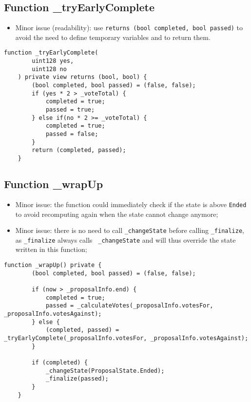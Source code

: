 \subsection{Function \_{}tryEarlyComplete}

\begin{itemize}
\item Minor issue (readability): use {\tt returns (bool completed,
  bool passed)} to avoid the need to define temporary variables and to
  return them.
\end{itemize}

\begin{lstlisting}[firstnumber=130]
    function _tryEarlyComplete(
        uint128 yes,
        uint128 no
    ) private view returns (bool, bool) {
        (bool completed, bool passed) = (false, false);
        if (yes * 2 > _voteTotal) {
            completed = true;
            passed = true;
        } else if(no * 2 >= _voteTotal) {
            completed = true;
            passed = false;
        }
        return (completed, passed);
    }
\end{lstlisting}

\subsection{Function \_{}wrapUp}

\begin{itemize}
\item Minor issue: the function could immediately check if the state
  is above {\tt Ended} to avoid recomputing again when the state
  cannot change anymore;
\item Minor issue: there is no need to call {\tt \_changeState} before
  calling {\tt \_finalize}, as {\tt \_finalize} always calls {\tt
    \_changeState} and will thus override the state written in this
  function;
\end{itemize}

\begin{lstlisting}[firstnumber=145]
    function _wrapUp() private {
        (bool completed, bool passed) = (false, false);

        if (now > _proposalInfo.end) {
            completed = true;
            passed = _calculateVotes(_proposalInfo.votesFor, _proposalInfo.votesAgainst);
        } else {
            (completed, passed) = _tryEarlyComplete(_proposalInfo.votesFor, _proposalInfo.votesAgainst);
        }

        if (completed) {
            _changeState(ProposalState.Ended);
            _finalize(passed);
        }
    }
\end{lstlisting}
